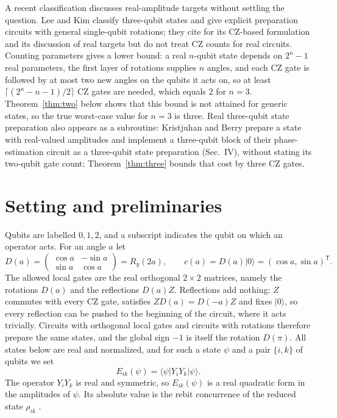 \documentclass[11pt,a4paper]{article}
\theoremstyle{definition}
\theoremstyle{plain}
\newcommand{\ket}[1]{\lvert#1\rangle}
\newcommand{\bra}[1]{\langle#1\rvert}
\newcommand{\T}{\mathsf{T}}
\begin{document}
A recent classification discusses real-amplitude targets without settling the
question. Lee and Kim \cite{Lee2026} classify three-qubit states and give
explicit preparation circuits with general single-qubit rotations; they cite
\cite{Perdomo2022} for its CZ-based formulation and its discussion of real
targets but do not treat CZ counts for real circuits. Counting parameters gives
a lower bound: a real $n$-qubit state depends on $2^n-1$ real parameters, the
first layer of rotations supplies $n$ angles, and each CZ gate is followed by
at most two new angles on the qubits it acts on, so at least
$\lceil(2^n-n-1)/2\rceil$ CZ gates are needed, which equals $2$ for $n=3$.
Theorem~\ref{thm:two} below shows that this bound is not attained for generic
states, so the true worst-case value for $n=3$ is three. Real three-qubit state
preparation also appears as a subroutine: Kristjuhan and Berry
\cite{KristjuhanBerry2026} prepare a state with real-valued amplitudes and
implement a three-qubit block of their phase-estimation circuit as a
three-qubit state preparation (Sec.~IV), without stating its two-qubit gate
count; Theorem~\ref{thm:three} bounds that cost by three CZ gates.

\section{Setting and preliminaries}\label{sec:setting}
Qubits are labelled $0,1,2$, and a subscript indicates the qubit on which an
operator acts. For an angle $a$ let
\[
D(a)=\begin{pmatrix}\cos a&-\sin a\\ \sin a&\cos a\end{pmatrix}=R_y(2a),
\qquad c(a)=D(a)\ket0=(\cos a,\sin a)^\T .
\]
The allowed local gates are the real orthogonal $2\times2$ matrices, namely
the rotations $D(a)$ and the reflections $D(a)Z$. Reflections add nothing:
$Z$ commutes with every CZ gate, satisfies $ZD(a)=D(-a)Z$ and fixes $\ket0$, so
every reflection can be pushed to the beginning of the circuit, where it acts
trivially. Circuits with orthogonal local gates and circuits with rotations
therefore prepare the same states, and the global sign $-1$ is itself the
rotation $D(\pi)$. All states below are real and normalized, and for such a
state $\psi$ and a pair $\{i,k\}$ of qubits we set
\[
E_{ik}(\psi)=\bra\psi Y_iY_k\ket\psi .
\]
The operator $Y_iY_k$ is real and symmetric, so $E_{ik}(\psi)$ is a real
quadratic form in the amplitudes of $\psi$. Its absolute value is the rebit
concurrence of the reduced state $\rho_{ik}$ \cite{CavesFuchsRungta2001}.
\end{document}
